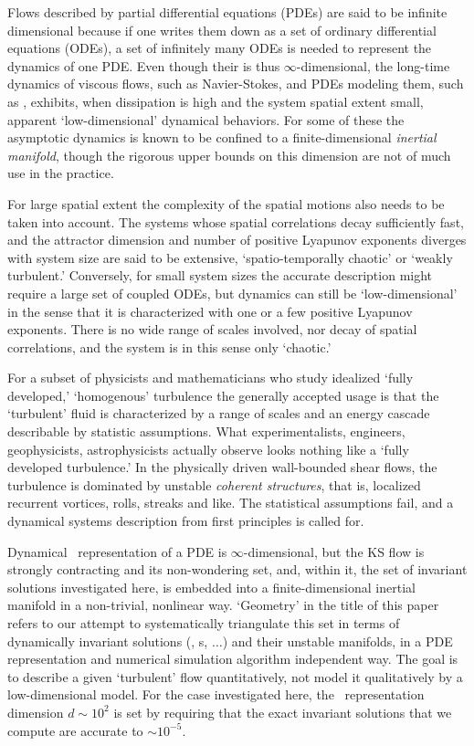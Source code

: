 {
Flows described by partial differential equations (PDEs) are
said to be infinite dimensional because if one writes them
down as a set of ordinary differential equations (ODEs), a set
of infinitely many ODEs is needed to represent the dynamics
of one PDE. Even though their {\statesp} is thus
$\infty$-dimensional, the long-\-time dynamics of viscous
flows, such as Navier-Stokes, and PDEs modeling them, such as
\KS, exhibits, when dissipation is high and
the system spatial extent small, apparent `low-dimensional'
dynamical behaviors. For some of these the asymptotic
dynamics is known to be confined to a finite-\-dimensional
{\em inertial manifold}, though the rigorous upper bounds on
this dimension are not of much use in the practice.

For large spatial extent the complexity of the spatial
motions also needs to be taken into account. The systems
whose spatial correlations decay sufficiently fast, and the
attractor dimension and number of positive Lyapunov exponents
diverges with system size are said
to be extensive, `spatio-temporally chaotic' or `weakly
turbulent.' Conversely, for small system sizes the accurate
description might require a large set of coupled
ODEs, but dynamics can still be `low-dimensional' in the
sense that it is characterized with one or a few positive
Lyapunov exponents. There is no wide range of scales
involved, nor decay of spatial correlations, and the system
is in this sense only `chaotic.'

For a subset of physicists and mathematicians who study
idealized `fully developed,' `homogenous' turbulence the
generally accepted usage is that the `turbulent' fluid is
characterized by a range of scales and an energy cascade
describable by statistic assumptions. What experimentalists,
engineers, geophysicists, astrophysicists actually observe
looks nothing like a `fully developed turbulence.' In the
physically driven wall-bounded shear flows, the turbulence is
dominated by unstable \emph{coherent structures}, that is,
localized recurrent vortices, rolls, streaks and like. The
statistical assumptions fail, and a dynamical systems
description from first principles is called for.
} %

Dynamical \statesp\ representation of a PDE is
$\infty$-dimensional, but the KS flow is strongly contracting
and its non-wondering set, and, within it, the set of
invariant solutions investigated here, is embedded into a
finite-dimensional inertial manifold in a
non-trivial, nonlinear way. `Geometry' in the title of this
paper refers to our attempt to systematically triangulate
this set in terms of dynamically invariant solutions (\eqva,
\po s, $\ldots$) and their unstable manifolds, in a PDE
representation and numerical simulation algorithm independent
way. The goal is to describe a given `turbulent' flow
quantitatively, not model it qualitatively by a
low-dimensional model. For the case investigated here, the
\statesp\ representation dimension $d \sim 10^2$ is set by
requiring that the exact invariant solutions that we compute
are accurate to $\sim 10^{-5}$.

